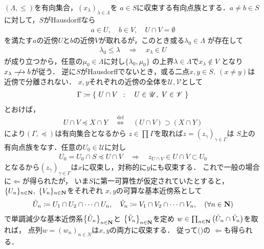 	\begin{prf}
		$(\Lambda,\leq)$を有向集合，$(x_\lambda)_{\lambda \in \Lambda}$を
		$a \in S$に収束する有向点族とする．$a \neq b \in S$に対して，$S$がHausdorffなら
		\begin{align}
			a \in U,\quad b \in V,\quad U \cap V = \emptyset
		\end{align}
		を満たす$a$の近傍$U$と$b$の近傍$V$が取れるが，このとき或る$\lambda_0 \in \Lambda$
		が存在して
		\begin{align}
			\lambda_0 \leq \lambda \quad \Longrightarrow \quad
			x_\lambda \in U
		\end{align}
		が成り立つから，任意の$\mu_0 \in \Lambda$に対し$\{\lambda_0,\mu_0\}$
		の上界$\lambda \in \Lambda$で$x_\lambda \notin V$
		となり$x_\lambda \centernot\longrightarrow b$が従う．
		逆に$S$がHausdorffでないとき，或る二点$x,y \in S,\ (x \neq y)$は近傍で分離されない．
		$x,y$それぞれの近傍の全体を$\mathscr{U},\mathscr{V}$として
		\begin{align}
			\Gamma \coloneqq \left\{\ U \cap V\ \, : \quad U \in \mathscr{U},\ V \in \mathscr{V}\ \right\}
		\end{align}
		とおけば，
		\begin{align}
			U \cap V \preceq X \cap Y
			\quad \overset{\mathrm{def}}{\Longleftrightarrow} \quad
			(U \cap V) \supset (X \cap Y)
		\end{align}
		により$(\Gamma,\preceq)$は有向集合となるから
		$z \in \prod \Gamma$を取れば$z = (z_\gamma)_{\gamma \in \Gamma}$は
		$S$上の有向点族をなす．任意の$U_0 \in \mathscr{U}$に対し
		\begin{align}
			U_0 = U_0 \cap S \preceq U \cap V
			\quad \Longrightarrow \quad
			z_{U \cap V} \in U \cap V \subset U_0
		\end{align}
		となるから$(z_\gamma)_{\gamma \in \Gamma}$は$x$に収束し，対称的に$y$にも収束する．
		これで一般の場合に$\Longleftarrow$が得られたが，
		いま$S$に第一可算性が仮定されていたとすると，
		$\{U_n\}_{n \in \mathbf{N}},\ \{V_n\}_{n \in \mathbf{N}}$をそれぞれ
		$x,y$の可算な基本近傍系として
		\begin{align}
			\tilde{U}_n \coloneqq U_1 \cap U_2 \cap \cdots \cap U_n,
			\quad \tilde{V}_n \coloneqq V_1 \cap V_2 \cap \cdots \cap V_n,
			\quad (\forall n \in \mathbf{N})
		\end{align}
		で単調減少な基本近傍系$\left\{\tilde{U}_n\right\}_{n \in \mathbf{N}}$と
		$\left\{\tilde{V}_n\right\}_{n \in \mathbf{N}}$を定め
		$w \in \prod_{n \in \mathbf{N}} \left(\tilde{U}_n \cap \tilde{V}_n\right)$を取れば，
		点列$w = (w_n)_{n \in N}$は$x,y$の両方に収束する．
		従って()の
		$\Longleftarrow$も得られる．
		\QED
	\end{prf}
	
